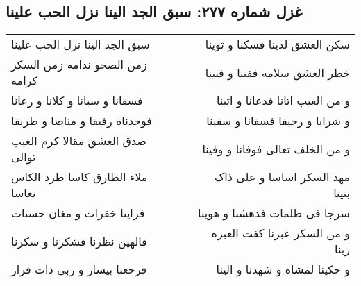 \begin{center}
\section*{غزل شماره ۲۷۷: سبق الجد الینا نزل الحب علینا}
\label{sec:0277}
\begin{longtable}{l p{0.5cm} r}
سبق الجد الینا نزل الحب علینا
&&
سکن العشق لدینا فسکنا و ثوینا
\\
زمن الصحو ندامه زمن السکر کرامه
&&
خطر العشق سلامه ففتنا و فنینا
\\
فسقانا و سبانا و کلانا و رعانا
&&
و من الغیب اتانا فدعانا و اتینا
\\
فوجدناه رفیقا و مناصا و طریقا
&&
و شرابا و رحیقا فسقانا و سقینا
\\
صدق العشق مقالا کرم الغیب توالی
&&
و من الخلف تعالی فوفانا و وفینا
\\
ملاء الطارق کاسا طرد الکاس نعاسا
&&
مهد السکر اساسا و علی ذاک بنینا
\\
فراینا خفرات و مغان حسنات
&&
سرجا فی ظلمات فدهشنا و هوینا
\\
فالهین نظرنا فشکرنا و سکرنا
&&
و من السکر عبرنا کفت العبره زینا
\\
فرحعنا بیسار و ربی ذات قرار
&&
و حکینا لمشاه و شهدنا و الینا
\\
\end{longtable}
\end{center}
